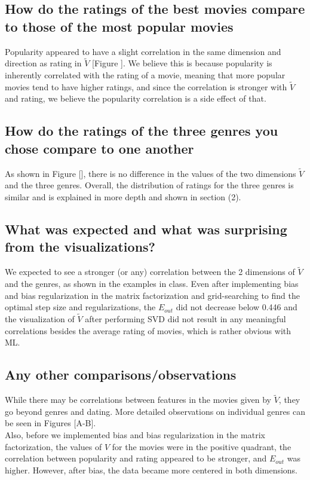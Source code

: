 \subsection{How do the ratings of the best movies compare to those of the most popular movies}
Popularity appeared to have a slight correlation in the same dimension and direction as rating in $\widetilde{V}$ [Figure ]. We believe this is because popularity is inherently correlated with the rating of a movie, meaning that more popular movies tend to have higher ratings, and since the correlation is stronger with $\widetilde{V}$ and rating, we believe the popularity correlation is a side effect of that.

\subsection{How do the ratings of the three genres you chose compare to one another}
As shown in Figure [], there is no difference in the values of the two dimensions $\widetilde{V}$ and the three genres. Overall, the distribution of ratings for the three genres is similar and is explained in more depth and shown in section (2).

\subsection{What was expected and what was surprising from the visualizations?}
We expected to see a stronger (or any) correlation between the 2 dimensions of $\widetilde{V}$ and the genres, as shown in the examples in class. Even after implementing bias and bias regularization in the matrix factorization and grid-searching to find the optimal step size and regularizations, the $E_{out}$ did not decrease below 0.446 and the visualization of $\widetilde{V}$ after performing SVD did not result in any meaningful correlations besides the average rating of movies, which is rather obvious with ML.

\subsection{Any other comparisons/observations}
While there may be correlations between features in the movies given by $\widetilde{V}$, they go beyond genres and dating. More detailed observations on individual genres can be seen in Figures [A-B].\\

Also, before we implemented bias and bias regularization in the matrix factorization, the values of $V$ for the movies were in the positive quadrant, the correlation between popularity and rating appeared to be stronger, and $E_{out}$ was higher. However, after bias, the data became more centered in both dimensions.



